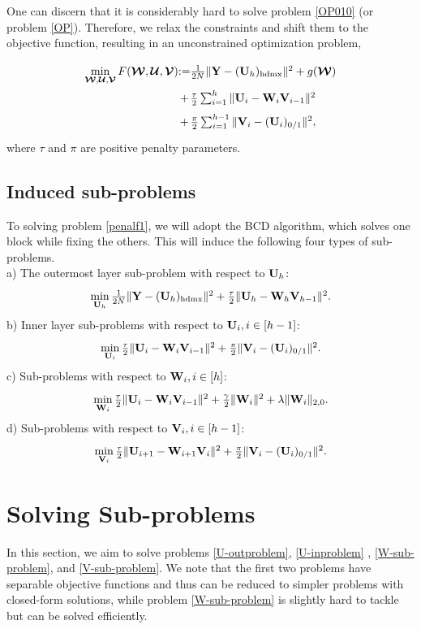 \documentclass[journal]{IEEEtran}
\newcommand{\ba}{\begin{array}}
\newcommand{\ea}{\end{array}}
\newcommand{\be}{\begin{equation}}
\newcommand{\ee}{\end{equation}}
\def\U{{\bf U}}
\def\V{{\bf V}}
\def\W{{\bf W}}
\def\Y{{\bf Y}}
\def\CU{{\boldsymbol{\mathcal U}}}
\def\CV{{\boldsymbol{\mathcal V}}}
\def\CW{{\boldsymbol{\mathcal W}}}
\def\hd{{\rm hdmx}}
\begin{document}
One can discern that it is considerably hard to solve problem \eqref{OP010} (or problem \eqref{OP}). Therefore,  we relax the constraints and shift them to the objective function, resulting in an unconstrained optimization problem,
\be\label{penalf1}
 \arraycolsep=0.0pt\def\arraystretch{1.75}
\begin{array}{lcl}
\min\limits_{\CW,\CU,\CV} F(\CW,\CU,\CV)&:=&  \frac{1}{2N} \|\Y- (\U_h)_{\hd}\|^{2}+ g(\CW)\\
&+&\frac{\tau}{2} \sum_{i=1}^h \|\U_i-\W_{i}\V_{i-1}\|^2 \\
&+& \frac{\pi }{2}\sum_{i=1}^{h-1}\|\V_i-(\U_{i})_{0/1}\|^2,
\end{array}
\ee
where $\tau$ and $\pi$ are positive penalty parameters.

\subsection{Induced sub-problems}\label{sec:induced}
To solving problem \eqref{penalf1}, we will adopt the BCD algorithm, which solves one block while fixing the others. This will induce the following four types of sub-problems.\\
a) The outermost layer sub-problem with respect to $\U_{h}$:
\be\label{U-outproblem}
\arraycolsep=1.0pt\def\arraystretch{1.25}
\ba{l}
\min\limits_{\U_h} \frac{1}{2N}\|\Y- (\U_h)_{\hd}\|^{2}+\frac{\tau}{2} \|\U_h-\W_h\V_{h-1}\|^2.
\ea\ee
b) Inner layer sub-problems with respect to  $\U_i,i\in[h-1]$:
\be\label{U-inproblem}
\ba{cl}
\min\limits_{\U_i}\frac{\tau}{2} \|\U_i-\W_{i}\V_{i-1}\|^2+ \frac{\pi }{2} \|\V_i-(\U_{i})_{0/1}\|^2.
\ea\ee
c) Sub-problems with respect to  $\W_i, i\in[h]$:
\be\label{W-sub-problem}
\ba{cl}
\min\limits_{\W_i} \frac{\tau}{2}\|\U_i-\W_i\V_{i-1}\|^2+\frac{\gamma}{2} \|\W_i\|^2+\lambda \|\W_i\|_{2,0}.
\ea\ee
d) Sub-problems with respect to  $\V_i, i\in[h-1]$:
\be\label{V-sub-problem}
 \arraycolsep=0.4pt\def\arraystretch{1.25}
\ba{crl}
\min\limits_{\V_i}\frac{\tau}{2}\|\U_{i+1}-\W_{i+1}\V_{i}\|^2+ \frac{\pi }{2} \|\V_i-(\U_{i})_{0/1}\|^2.
\ea\ee


\section{Solving Sub-problems} \label{Section-Technical}
In this section,  we aim to solve problems \eqref{U-outproblem}, \eqref{U-inproblem} ,  \eqref{W-sub-problem}, and \eqref{V-sub-problem}. We note that the first two problems  have separable objective functions and thus can be reduced to simpler problems with closed-form solutions, while problem \eqref{W-sub-problem} is slightly hard to tackle but can be solved efficiently.
\end{document}

